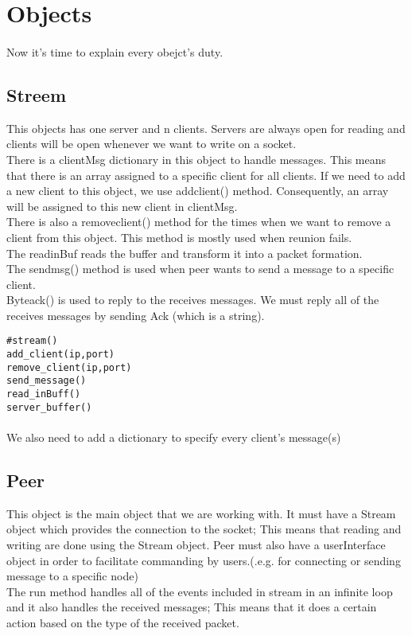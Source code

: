 \documentclass{article}
\begin{document}
\section{Objects}
\paragraph{}Now it's time to explain every obejct's duty.
\subsection{Streem}This objects has one server and n clients. Servers are always open for reading and clients will be open whenever we want to write on a socket. \\
There is a clientMsg dictionary in this object to handle messages. This means that there is an array assigned to a specific client for all clients. If we need to add a new client to this object, we use add\underline{\hspace{.05in}}client() method. Consequently, an array will be assigned to this new client in clientMsg.\\
There is also a remove\underline{\hspace{.05in}}client() method for the times when we want to remove a client from this object. This method is mostly used  when reunion fails.\\
The read\underline{\hspace{.05in}}inBuf reads the buffer and transform it into a packet formation.\\
The send\underline{\hspace{.05in}}msg() method is used when peer wants to send a message to a specific client.\\
Byte\underline{\hspace{.05in}}ack() is used to reply to the receives messages. We must reply all of the receives messages by sending Ack (which is a string).\\
\begin{lstlisting}
#stream()
add_client(ip,port)
remove_client(ip,port)
send_message()
read_inBuff()
server_buffer()
\end{lstlisting}
\paragraph{}We also need to add a dictionary to specify every client's message(s)
\subsection{Peer}This object is the main object that we are working with. It must have a Stream object which provides the connection to the socket; This means that reading and writing are done using the Stream object. Peer must also have a userInterface object in order to facilitate commanding by users.(.e.g. for connecting or sending message to a specific node)\\
The run method handles all of the events included in stream in an infinite loop and it also handles the received messages; This means that it does a certain action based on the type of the received packet.
\end{document}
